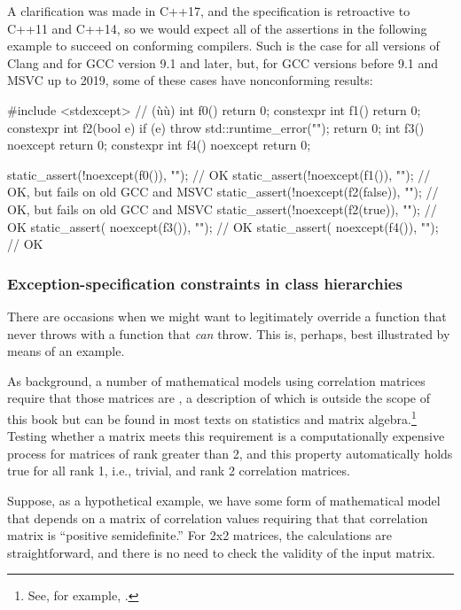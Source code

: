 A clarification was made in C++17, and the specification is retroactive
to C++11 and C++14, so we would expect all of the assertions in the
following example to succeed on conforming compilers. Such is the case
for all versions of Clang and for GCC version 9.1 and later, but, for
GCC versions before 9.1 and MSVC up to 2019, some of these cases have
nonconforming results:

\begin{emcppslisting}[emcppsstandards={c++14}]
#include <stdexcept>  // (ù{}ù)
          int f0()          { return 0; }
constexpr int f1()          { return 0; }
constexpr int f2(bool e)    { if (e) throw std::runtime_error(""); return 0; }
          int f3() noexcept { return 0; }
constexpr int f4() noexcept { return 0; }

static_assert(!noexcept(f0()),      "");  // OK
static_assert(!noexcept(f1()),      "");  // OK, but fails on old GCC and MSVC
static_assert(!noexcept(f2(false)), "");  // OK, but fails on old GCC and MSVC
static_assert(!noexcept(f2(true)),  "");  // OK
static_assert( noexcept(f3()),      "");  // OK
static_assert( noexcept(f4()),      "");  // OK
\end{emcppslisting}
    

\subsubsection[Exception-specification constraints in class hierarchies]{Exception-specification constraints in class hierarchies}\label{exception-specification-constraints-in-class-hierarchies}

There are occasions when we might want to legitimately override a
function that never throws with a function that \emph{can} throw. This
is, perhaps, best illustrated by means of an example.

As background, a number of mathematical models using correlation
matrices require that those matrices are ,
a description of which is outside the scope of this book but can be
found in most texts on statistics and matrix algebra.\footnote{See, for example, \cite{vandenbos17}.} Testing
whether a matrix meets this requirement is a computationally expensive
process for matrices of rank greater than 2, and this property
automatically holds true for all rank 1, i.e., trivial, and rank 2
correlation matrices.

Suppose, as a hypothetical example, we have some form of mathematical
model that depends on a matrix of correlation values requiring that that
correlation matrix is ``positive semidefinite.'' For 2x2 matrices, the
calculations are straightforward, and there is no need to check the
validity of the input matrix.

